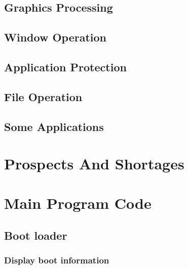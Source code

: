 \documentclass{swfcthesis}
\begin{document}
\section{Graphics Processing}

\section{Window Operation}

\section{Application Protection}

\section{File Operation}

\section{Some Applications}

\chapter{Prospects And Shortages}


\Appendix{}
\printbibliography[heading={bibintoc},title={参考文献}] %
\advisorinfopage{}                 %
\acknowledgmentspage{}             %


\chapter{Main Program Code} %

\section{Boot loader}

\subsection{Display boot information}
\label{sec:dis-boo-inf}

\inputminted[firstline=55, lastline=65,
  linenos=true]{nasm}{../../src/06day/RongC/ipl10.asm}
\end{document}
